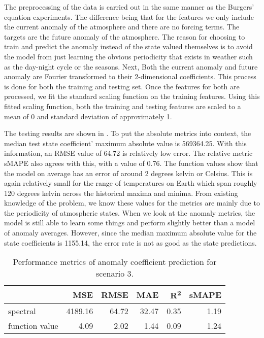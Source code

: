 The preprocessing of the data is carried out in the same manner as the Burgers' equation experiments. The difference being that for the features we only include the current anomaly of the atmosphere and there are no forcing terms. The targets are the future anomaly of the atmosphere. The reason for choosing to train and predict the anomaly instead of the state valued themselves is to avoid the model from just learning the obvious periodicity that exists in weather such as the day-night cycle or the seasons. Next, Both the current anomaly and future anomaly are Fourier transformed to their 2-dimensional coefficients. This process is done for both the training and testing set. Once the features for both are processed, we fit the standard scaling function on the training features. Using this fitted scaling function, both the training and testing features are scaled to a mean of 0 and standard deviation of approximately 1.

The testing results are shown in . To put the absolute metrics into context, the median test state coefficient' maximum absolute value is \num{569364.25}. With this information, an RMSE value of 64.72 is relatively low error. The relative metric sMAPE also agrees with this, with a value of 0.76. The function values show that the model on average has an error of around 2 degrees kelvin or Celsius. This is again relatively small for the range of temperatures on Earth which span roughly 120 degrees kelvin across the historical maxima and minima. From existing knowledge of the problem, we know these values for the metrics are mainly due to the periodicity of atmospheric states. When we look at the anomaly metrics, the model is still able to learn some things and perform slightly better than a model of anomaly averages. However, since the median maximum absolute value for the state coefficients is \num{1155.14}, the error rate is not as good as the state predictions.
\begin{table}[H]
  \caption{Performance metrics of anomaly coefficient prediction for scenario 3.}\label{table:sc3_test_anomaly_metrics}
  \centering
  \begin{tabular}{lrrrrr}
    \toprule
                   & MSE     & RMSE  & MAE   & R\textsuperscript{2}   & sMAPE \\
    \midrule
    spectral       & 4189.16 & 64.72 & 32.47 & 0.35 & 1.19  \\
    function value & 4.09    & 2.02  & 1.44  & 0.09 & 1.24  \\
    \bottomrule
  \end{tabular}
\end{table}

